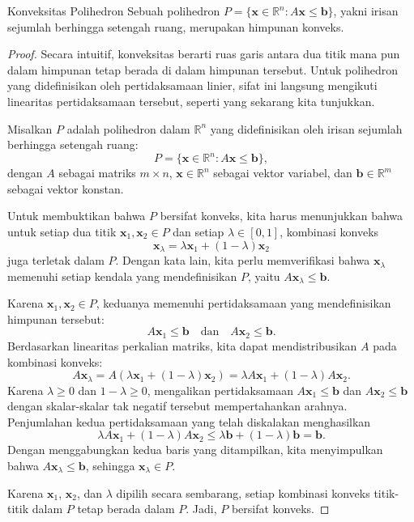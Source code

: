 %
\begin{theorem}{Konveksitas Polihedron}
\label{thm:polyhedra_convex}
Sebuah polihedron \( P = \{\mathbf{x} \in \mathbb{R}^n : A\mathbf{x} \leq \mathbf{b}\} \), yakni irisan sejumlah berhingga setengah ruang, merupakan himpunan konveks.
\end{theorem}
%
\begin{proof}
Secara intuitif, konveksitas berarti ruas garis antara dua titik mana pun dalam himpunan tetap berada di dalam himpunan tersebut. Untuk polihedron yang didefinisikan oleh pertidaksamaan linier, sifat ini langsung mengikuti linearitas pertidaksamaan tersebut, seperti yang sekarang kita tunjukkan.

Misalkan \( P \) adalah polihedron dalam \(\mathbb{R}^n\) yang didefinisikan oleh irisan sejumlah berhingga setengah ruang:
\[
P = \{\mathbf{x} \in \mathbb{R}^n : A\mathbf{x} \leq \mathbf{b}\},
\]
dengan \(A\) sebagai matriks \(m \times n\), \(\mathbf{x} \in \mathbb{R}^n\) sebagai vektor variabel, dan \(\mathbf{b} \in \mathbb{R}^m\) sebagai vektor konstan.

Untuk membuktikan bahwa \(P\) bersifat konveks, kita harus menunjukkan bahwa untuk setiap dua titik \(\mathbf{x}_1, \mathbf{x}_2 \in P\) dan setiap \(\lambda \in [0, 1]\), kombinasi konveks
\[
\mathbf{x}_\lambda = \lambda \mathbf{x}_1 + (1 - \lambda) \mathbf{x}_2
\]
juga terletak dalam \(P\). Dengan kata lain, kita perlu memverifikasi bahwa \(\mathbf{x}_\lambda\) memenuhi setiap kendala yang mendefinisikan \(P\), yaitu \(A\mathbf{x}_\lambda \leq \mathbf{b}\).

Karena \(\mathbf{x}_1, \mathbf{x}_2 \in P\), keduanya memenuhi pertidaksamaan yang mendefinisikan himpunan tersebut:
\[
A\mathbf{x}_1 \leq \mathbf{b} \quad \text{dan} \quad A\mathbf{x}_2 \leq \mathbf{b}.
\]
Berdasarkan linearitas perkalian matriks, kita dapat mendistribusikan \(A\) pada kombinasi konveks:
\[
A\mathbf{x}_\lambda = A(\lambda \mathbf{x}_1 + (1 - \lambda) \mathbf{x}_2) = \lambda A\mathbf{x}_1 + (1 - \lambda) A\mathbf{x}_2.
\]
Karena \(\lambda \geq 0\) dan \(1-\lambda \geq 0\), mengalikan pertidaksamaan \(A\mathbf{x}_1 \leq \mathbf{b}\) dan \(A\mathbf{x}_2 \leq \mathbf{b}\) dengan skalar-skalar tak negatif tersebut mempertahankan arahnya. Penjumlahan kedua pertidaksamaan yang telah diskalakan menghasilkan
\[
\lambda A\mathbf{x}_1 + (1 - \lambda) A\mathbf{x}_2 \leq \lambda \mathbf{b} + (1 - \lambda) \mathbf{b} = \mathbf{b}.
\]
Dengan menggabungkan kedua baris yang ditampilkan, kita menyimpulkan bahwa \(A\mathbf{x}_\lambda \leq \mathbf{b}\), sehingga \(\mathbf{x}_\lambda \in P\).

Karena \(\mathbf{x}_1\), \(\mathbf{x}_2\), dan \(\lambda\) dipilih secara sembarang, setiap kombinasi konveks titik-titik dalam \(P\) tetap berada dalam \(P\). Jadi, \(P\) bersifat konveks.
\end{proof}
%
%

